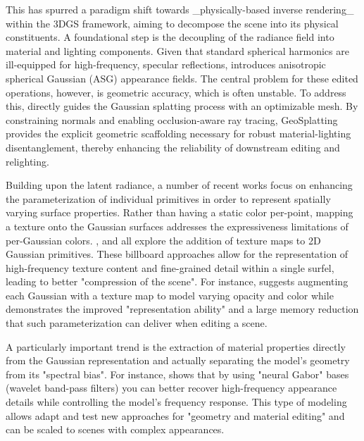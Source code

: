 \documentclass[11pt,a4paper]{article}
\begin{document}
This has spurred a paradigm shift towards \_physically-based inverse rendering\_ within the 3DGS framework, aiming to decompose the scene into its physical constituents. A foundational step is the decoupling of the radiance field into material and lighting components. Given that standard spherical harmonics are ill-equipped for high-frequency, specular reflections, \cite{arxiv:2402.15870v1} introduces anisotropic spherical Gaussian (ASG) appearance fields. The central problem for these edited operations, however, is geometric accuracy, which is often unstable. To address this, \cite{arxiv:2410.24204v3} directly guides the Gaussian splatting process with an optimizable mesh. By constraining normals and enabling occlusion-aware ray tracing, GeoSplatting provides the explicit geometric scaffolding necessary for robust material-lighting disentanglement, thereby enhancing the reliability of downstream editing and relighting.

Building upon the latent radiance, a number of recent works focus on enhancing the parameterization of individual primitives in order to represent spatially varying surface properties. Rather than having a static color per-point, mapping a texture onto the Gaussian surfaces addresses the expressiveness limitations of per-Gaussian colors. \cite{arxiv:2412.01823v1}, \cite{arxiv:2411.08508v4} and \cite{arxiv:2412.12734v1} all explore the addition of texture maps to 2D Gaussian primitives. These billboard approaches allow for the representation of high-frequency texture content and fine-grained detail within a single surfel, leading to better "compression of the scene". For instance, \cite{arxiv:2411.18625v2} suggests augmenting each Gaussian with a texture map to model varying opacity and color while \cite{arxiv:2411.18966v2} demonstrates the improved "representation ability" and a large memory reduction that such parameterization can deliver when editing a scene.

A particularly important trend is the extraction of material properties directly from the Gaussian representation and actually separating the model's geometry from its "spectral bias". For instance, \cite{arxiv:2604.15941v1} shows that by using "neural Gabor" bases (wavelet band-pass filters) you can better recover high-frequency appearance details while controlling the model's frequency response. This type of modeling allows adapt and test new approaches for "geometry and material editing" and can be scaled to scenes with complex appearances.
\end{document}

